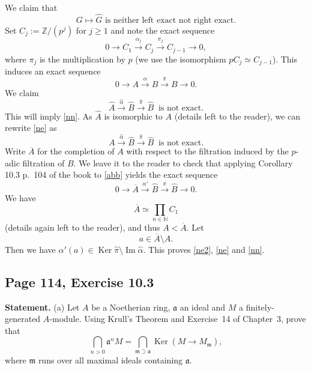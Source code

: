 \documentclass[parskip=half,fontsize=12pt]{scrartcl}%
\newcommand{\oo}{\operatorname}\newcommand{\ooo}{\operatorname*}
\newcommand{\mf}{\mathfrak}
\newcommand{\aaa}{\mf a}
\newcommand{\mmm}{\mf m}
\newcommand{\Ker}{\operatorname{Ker}}\newcommand{\Coker}{\operatorname{Coker}}
\newcommand{\xr}{\xrightarrow}
\begin{document}
We claim that 
\begin{equation}\label{nn}
G\mapsto\widehat G\text{ is neither left exact not right exact.}
\end{equation}
Set $C_j:=\mathbb Z/(p^j)$ for $j\ge1$ and note the exact sequence 
$$
0\to C_1\xr{\alpha_j}C_j\xr{\pi_j}C_{j-1}\to0,
$$ 
where $\pi_j$ is the multiplication by $p$ (we use the isomorphism $pC_j\simeq C_{j-1}$). This induces an exact sequence 
\begin{equation}\label{abb}
0\to A\xr{\alpha}B\xr{\pi}B\to0.
\end{equation} 
We claim 
\begin{equation}\label{ne}
\widehat A\xr{\widehat\alpha}\widehat B\xr{\widehat\pi}\widehat B\ \text{ is not exact.}
\end{equation} 
This will imply \eqref{nn}. As $\widehat A$ is isomorphic to $A$ (details left to the reader), we can rewrite \eqref{ne} as  
\begin{equation}\label{ne2}
A\xr{\widehat\alpha}\widehat B\xr{\widehat\pi}\widehat B\ \text{ is not exact.}
\end{equation} 
Write $\overline A$ for the completion of $A$ with respect to the filtration induced by the $p$-adic filtration of $B$. We leave it to the reader to check that applying Corollary 10.3 p.~104 of the book to \eqref{abb} yields the exact sequence 
$$
0\to\overline A\xr{\alpha'}\widehat B\xr{\pi}\widehat B\to0.
$$ 
We have 
$$
\overline A\simeq\prod_{n\in\mathbb N}C_1
$$ 
(details again left to the reader), and thus $A<\overline A$. Let 
$$
a\in\overline A\setminus A.
$$ 
Then we have $\alpha'(a)\in\oo{Ker}\widehat\pi\setminus\oo{Im}\widehat\alpha$. This proves \eqref{ne2}, \eqref{ne} and \eqref{nn}.


\subsection{Page 114, Exercise 10.3}%

\textbf{Statement.} (a) Let $A$ be a Noetherian ring, $\aaa$ an ideal and $M$ a finitely-generated $A$-module. Using Krull's Theorem and Exercise~14 of Chapter~3, prove that 
$$
\bigcap_{n>0}\aaa^nM=\bigcap_{\mmm\supset\aaa}\Ker(M\to M_\mmm),
$$ 
where $\mmm$ runs over all maximal ideals containing $\aaa$.
\end{document}
